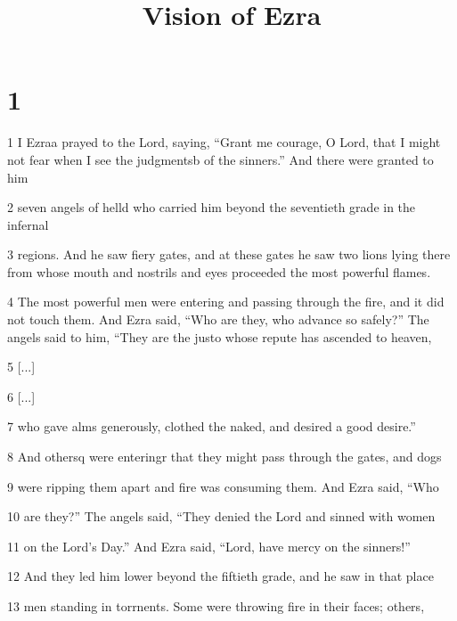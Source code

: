 

\title{Vision of Ezra}

\chapter{1}

\par 1 I Ezraa prayed to the Lord, saying, “Grant me courage, O Lord, that I might not fear when I see the judgmentsb of the sinners.” And there were granted to him

\par 2 seven angels of helld who carried him beyond the seventieth grade in the infernal

\par 3 regions. And he saw fiery gates, and at these gates he saw two lions lying there from whose mouth and nostrils and eyes proceeded the most powerful flames.

\par 4 The most powerful men were entering and passing through the fire, and it did not touch them. And Ezra said, “Who are they, who advance so safely?” The angels said to him, “They are the justo whose repute has ascended to heaven,

\par 5 [...]

\par 6 [...]

\par 7 who gave alms generously, clothed the naked, and desired a good desire.” 

\par 8 And othersq were enteringr that they might pass through the gates, and dogs

\par 9 were ripping them apart and fire was consuming them. And Ezra said, “Who

\par 10 are they?” The angels said, “They denied the Lord and sinned with women

\par 11 on the Lord's Day.” And Ezra said, “Lord, have mercy on the sinners!”

\par 12 And they led him lower beyond the fiftieth grade, and he saw in that place

\par 13 men standing in torrnents. Some were throwing fire in their faces; others,

